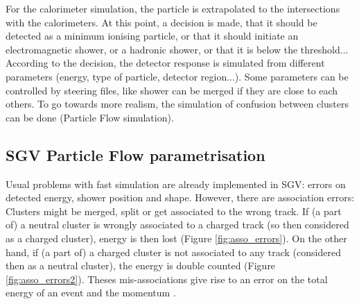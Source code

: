 \documentclass[a4paper,12pt]{article}
\begin{document}
For the calorimeter simulation, the particle is extrapolated to the intersections with the calorimeters. At this point, a decision is made, that it should be detected as a minimum ionising particle, or that it should initiate an electromagnetic shower, or a hadronic shower, or that it is below the threshold... According to the decision, the detector response is simulated from different parameters (energy, type of particle, detector region...). Some parameters can be controlled by steering files, like shower can be merged if they are close to each others. To go towards more realism, the simulation of confusion between clusters can be done (Particle Flow simulation). 

\subsection{SGV Particle Flow parametrisation}
\label{sec:sgv_pflow}

Usual problems with fast simulation are already implemented in SGV: errors on detected energy, shower position and shape. However, there are association errors: Clusters might be merged, split or get associated to the wrong track. If (a part of) a neutral cluster is wrongly associated to a charged track (so then considered as a charged cluster), energy is then lost (Figure \ref{fig:asso_errors}). On the other hand, if (a part of) a charged cluster is not associated to any track (considered then as a neutral cluster), the energy is double counted (Figure \ref{fig:asso_errors2}). Theses mis-associations give rise to an error on the total energy of an event and the momentum \cite{Madalina}.
\end{document}
